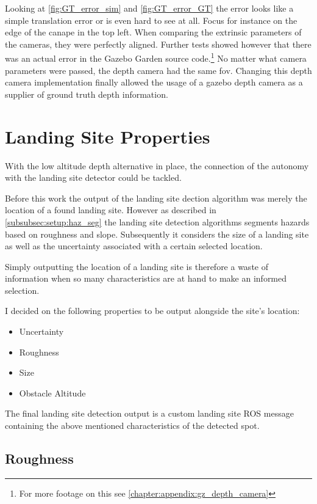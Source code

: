 \clearpage %

Looking at \cref{fig:GT_error_sim} and \cref{fig:GT_error_GT} the error looks like a simple translation error or is even hard to see at all. Focus for instance on the edge of the canape in the top left. When comparing the extrinsic parameters of the cameras, they were perfectly aligned. Further tests showed however that there was an actual error in the Gazebo Garden source code.\footnote[1]{For more footage on this see \cref{chapter:appendix:gz_depth_camera}} No matter what camera parameters were passed, the depth camera had the same fov. Changing this depth camera implementation finally allowed the usage of a gazebo depth camera as a supplier of ground truth depth information.

\section{Landing Site Properties}\label{sec:LSproperties}

With the low altitude depth alternative in place, the connection of the autonomy with the landing site detector could be tackled. 

Before this work the output of the landing site dection algorithm was merely the location of a found landing site. However as described in \cref{subsubsec:setup:haz_seg} the landing site detection algorithms segments hazards based on roughness and slope. Subsequently it considers the size of a landing site as well as the uncertainty associated with a certain selected location. 

Simply outputting the location of a landing site is therefore a waste of information when so many characteristics are at hand to make an informed selection. 

I decided on the following properties to be output alongside the site's location:

\begin{itemize}
    \item Uncertainty
    \item Roughness
    \item Size
    \item Obstacle Altitude
\end{itemize}
The final landing site detection output is a custom landing site ROS message containing the above mentioned characteristics of the detected spot.

\subsection{Roughness}


